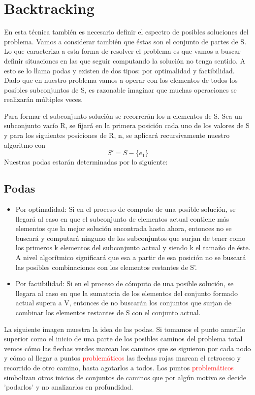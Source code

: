 \documentclass[10pt,a4paper]{article}
\begin{document}
\bigskip


\bigskip
\section{Backtracking}
En esta técnica también es necesario definir el espectro de posibles soluciones del problema. Vamos a considerar también que éstas son el conjunto de partes de S.
Lo que caracteriza a esta forma de resolver el problema es que vamos a buscar definir situaciones en las que seguir computando la solución no tenga sentido. A esto se lo llama podas y existen de dos tipos: por optimalidad y factibilidad. Dado que en nuestro problema vamos a operar con los elementos de todos los posibles subconjuntos de S, es razonable imaginar que muchas operaciones se realizarán múltiples veces. 

Para formar el subconjunto solución se recorrerán los n elementos de S. Sea un subconjunto vacío R, se fijará en la primera posición cada uno de los valores de S y para los siguientes posiciones de R, n, se aplicará recursivamente nuestro algoritmo con \[ S' = S - \{e_{1}\} \] Nuestras podas estarán determinadas por lo siguiente:

\subsection{Podas}
\begin{itemize}
	\item 
	Por optimalidad: Si en el proceso de computo de una posible solución, se llegará al caso en que el subconjunto de elementos actual contiene más elementos que la mejor solución encontrada hasta ahora, entonces no se buscará y computará ninguno de los subconjuntos que surjan de tener como los primeros k elementos del subconjunto actual y siendo k el tamaño de éste. A nivel algorítmico significará que esa a partir de esa posición no se buscará las posibles combinaciones con los elementos restantes de S’.
	
	\item 
	Por factibilidad: Si en el proceso de cómputo de una posible solución, se llegara al caso en que la sumatoria de los elementos del conjunto formado actual supera a V, entonces de no buscarán los conjuntos que surjan de combinar los elementos restantes de S con el conjunto actual.
\end{itemize}



\bigskip

La siguiente imagen muestra la idea de las podas. Si tomamos el punto amarillo superior como el inicio de una parte de los posibles caminos del problema total vemos cómo las flechas verdes marcan los caminos que se siguieron por cada nodo y cómo al llegar a puntos \textcolor{red}{problemáticos} las flechas rojas marcan el retroceso y recorrido de otro camino, hasta agotarlos a todos. Los puntos \textcolor{red}{problemáticos} simbolizan otros inicios de conjuntos de caminos que por algún motivo se decide 'podarlos' y no analizarlos en profundidad.
\end{document}
